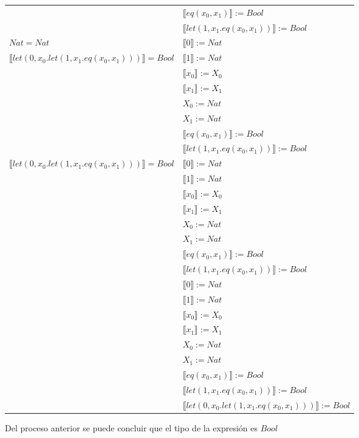\begin{exercise}
\begin{description}
\begin{center}
\begin{longtable}{ | l | l | }
				   &   $ \llbracket eq(x_0,x_1) \rrbracket  := Bool$ \\
				  &    $ \llbracket let(1,x_1.eq(x_0,x_1)) \rrbracket := Bool$  \\
		 \hline
                        $Nat = Nat$ &   $ \llbracket 0 \rrbracket := Nat$ \\      
                        $ \llbracket let(0,x_0.let(1,x_1.eq(x_0,x_1))) \rrbracket =  Bool$ &  $ \llbracket 1 \rrbracket := Nat$ \\    
				   &   $ \llbracket x_0 \rrbracket := X_0$  \\   
				   &    $ \llbracket x_1 \rrbracket := X_1$ \\  
				   &   $X_0 := Nat$ \\ 
				   &   $ X_1 := Nat $ \\ 
				   &    $ \llbracket eq(x_0,x_1) \rrbracket  := Bool$ \\ 
				   &    $ \llbracket let(1,x_1.eq(x_0,x_1)) \rrbracket := Bool$  \\
		 \hline
                        $ \llbracket let(0,x_0.let(1,x_1.eq(x_0,x_1))) \rrbracket =  Bool$ &   $ \llbracket 0 \rrbracket := Nat$ \\   
				   &    $ \llbracket 1 \rrbracket := Nat$ \\
				   &      $ \llbracket x_0 \rrbracket := X_0$  \\   
				   &    $ \llbracket x_1 \rrbracket := X_1$ \\    
				   &   $X_0 := Nat$ \\
				  &  $ X_1 := Nat $ \\  
				   &    $ \llbracket eq(x_0,x_1) \rrbracket  := Bool$ \\ 
				   &    $ \llbracket let(1,x_1.eq(x_0,x_1)) \rrbracket := Bool$  \\
		 \hline
           			  &   $ \llbracket 0 \rrbracket := Nat$ \\   
				   &   $ \llbracket 1 \rrbracket := Nat$ \\
				   &   $ \llbracket x_0 \rrbracket := X_0$  \\   
				   &   $ \llbracket x_1 \rrbracket := X_1$ \\    
				   &   $X_0 := Nat$ \\
				   &   $ X_1 := Nat $ \\  
				   &   $ \llbracket eq(x_0,x_1) \rrbracket  := Bool$ \\ 
				   &   $ \llbracket let(1,x_1.eq(x_0,x_1)) \rrbracket := Bool$  \\
           			   &   $ \llbracket let(0,x_0.let(1,x_1.eq(x_0,x_1))) \rrbracket :=  Bool$\\
		\hline
                    \end{longtable}
                \end{center}
        Del proceso anterior se puede concluir que el tipo de la expresión es $Bool$
        \end{description}
    \end{exercise}


